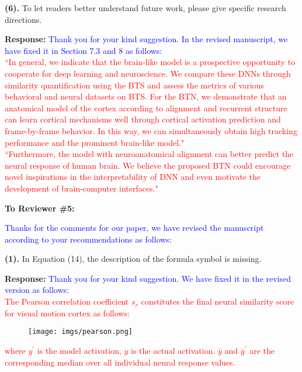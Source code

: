 \documentclass[12pt,journal,onecolumn]{IEEEtran}
\begin{document}


\textbf{(6).} To let readers better understand future work, please give specific research directions.

\textbf{Response:} \textcolor{blue}{Thank you for your kind suggestion. 
In the revised manuscript, we have fixed it in Section 7.3 and 8 as follows: \\
}
\textcolor{red}{
``In general, we indicate that the brain-like model is a prospective opportunity to cooperate for deep learning and neuroscience. We compare these DNNs through similarity quantification using the BTS and assess the metrics of various behavioral and neural datasets on BTS. 
For the BTN, we demonstrate that an anatomical model of the cortex according to alignment and recurrent structure can learn cortical mechanisms well through cortical activation prediction and frame-by-frame behavior. 
In this way, we can simultaneously obtain high tracking performance and the prominent brain-like model."
} \\
\textcolor{red}{
``Furthermore, the model with neuroanatomical alignment can better predict the neural response of human brain. 
We believe the proposed BTN could encourage novel inspirations in the interpretability of DNN 
and even motivate the development of brain-computer interfaces."
}



\vspace{8pt}


\vspace{8pt}

\newpage




\textbf{To Reviewer \#5:}

\textcolor{blue}{Thanks for the comments for our paper, we have revised the manuscript according to your recommendations as follows:}

\textbf{(1).} In Equation (14), the description of the formula symbol is missing.

\textbf{Response:} \textcolor{blue}{Thank you for your kind suggestion. 
We have fixed it in the revised version as follows: \\
}
\textcolor{red}{
The Pearson correlation coefficient $s_r$ constitutes the final neural similarity score for visual motion cortex as follows:
}
\begin{figure}[H]
	\centering 
	\texttt{[image: imgs/pearson.png]}
\end{figure}
\textcolor{red}{
where $y^\prime$ is the model activation, $y$ is the actual activation. $\bar{y}$ and $\bar{y}^\prime$ are the corresponding median over all individual neural response values.
}
\\
\vspace{8pt} 
\end{document}

